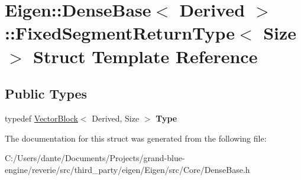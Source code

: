 \hypertarget{struct_eigen_1_1_dense_base_1_1_fixed_segment_return_type}{}\section{Eigen\+::Dense\+Base$<$ Derived $>$\+::Fixed\+Segment\+Return\+Type$<$ Size $>$ Struct Template Reference}
\label{struct_eigen_1_1_dense_base_1_1_fixed_segment_return_type}
\subsection*{Public Types}
\begin{DoxyCompactItemize}
\item 
\mbox{\label{struct_eigen_1_1_dense_base_1_1_fixed_segment_return_type_a611340fa5fd606f4b8ce34fad58012e5}} 
typedef \mbox{\hyperlink{class_eigen_1_1_vector_block}{Vector\+Block}}$<$ Derived, Size $>$ {\bfseries Type}
\end{DoxyCompactItemize}


The documentation for this struct was generated from the following file\+:\begin{DoxyCompactItemize}
\item 
C\+:/\+Users/dante/\+Documents/\+Projects/grand-\/blue-\/engine/reverie/src/third\+\_\+party/eigen/\+Eigen/src/\+Core/Dense\+Base.\+h\end{DoxyCompactItemize}
